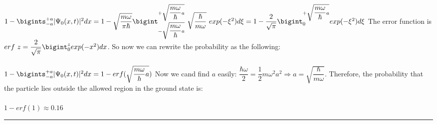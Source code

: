 \documentclass[fleqn]{article}
\begin{document}
\begin{itemize}
{        $
          1-\bigints_{-a}^{+a} |\Psi_0(x,t)|^2 dx=1-\sqrt{\dfrac{m \omega}{\pi \hbar}} \bigint_{-\sqrt{\dfrac{m \omega}{\hbar}a}}^{+\sqrt{\dfrac{m \omega}{\hbar}a}} ~ \sqrt{\dfrac{\hbar}{m \omega}} ~ exp(-\xi^2) d\xi \\
          \\
          \\
          =1-\dfrac{2}{\sqrt{\pi}} \bigint_{0}^{+\sqrt{\dfrac{m \omega}{\hbar}a}} exp(-\xi^2) d\xi \\
          \\
        $
        The error function is $erf ~ z=\dfrac{2}{\sqrt{\pi}} \bigint_{0}^{z} exp(-x^2) dx$. So now we can rewrite 
        the probability as the following: \\
        \\
        $
          1-\bigints_{-a}^{+a} |\Psi_0(x,t)|^2 dx=1-erf(\sqrt{\dfrac{m \omega}{\hbar}a}) \\ \\
        $
        Now we cand find $a$ easily: $\dfrac{\hbar \omega}{2}=\dfrac{1}{2} m \omega^2 a^2 \Longrightarrow a=\sqrt{\dfrac{\hbar}{m \omega}}$.
        Therefore, the probability that the particle lies outside the allowed region in the ground state is: \\
        \\
        $
          1-erf(1) \approx 0.16
        $
      }

  \end{itemize}

  \rule{15cm}{1pt}
\end{document}
